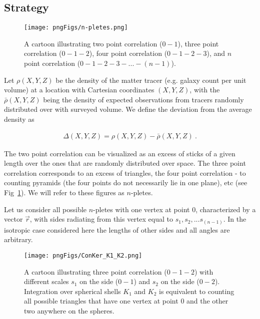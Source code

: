 \documentclass{aa}
\begin{document}
\subsection{Strategy} 
\label{subsec:Strategy}

\begin{figure}
\texttt{[image: pngFigs/n-pletes.png]}
\vspace{-1.7cm}
\caption{A cartoon illustrating two point correlation ($0-1$), three point correlation ($0-1-2$), four point correlation ($0-1-2-3$), and $n$  point correlation ($0-1-2-3-...-(n-1)$).}
\label{fig:n-pletes}
\end{figure}

Let $\rho(X,Y,Z)$ be the density of the matter tracer (e.g. galaxy count per unit volume) at a location with Cartesian coordinates $(X,Y,Z)$, with the $\bar{\rho}(X,Y,Z)$ being the density of expected observations from tracers randomly distributed over with surveyed volume. We define the deviation from the average density as

\begin{align}
\Delta(X,Y,Z) = \rho(X,Y,Z)- \bar{\rho}(X,Y,Z)\ . 
\label{eq:delta_def}
\end{align}

The two point correlation can be visualized as an excess of sticks of a given length over the ones that are randomly distributed over space. The three point correlation corresponds to an excess of triangles, the four point correlation - to counting pyramids (the four points do not necessarily lie in one plane), etc (see Fig~\ref{fig:n-pletes}). We will refer to these figures as $n$-pletes. 

Let us consider all possible $n$-pletes with one vertex at point $0$, characterized by a vector $\vec{r}$, with sides radiating from this vertex equal to $s_1,s_2, ... s_{(n-1)}$. In the isotropic case considered here the lengths of other sides and all angles are arbitrary. 

\begin{figure}
\texttt{[image: pngFigs/ConKer\_K1\_K2.png]}
\vspace{-0.8cm}
\caption{A cartoon illustrating  three point correlation ($0-1-2$) with different scales $s_1$ on the side ($0-1$) and $s_2$ on the side ($0-2$). Integration over spherical shells $K_1$ and $K_2$ is equivalent to counting all possible triangles that have one vertex at point $0$ and the other two anywhere on the spheres.}
\label{fig:ConKer_K1_K2}
\end{figure}
\end{document}
